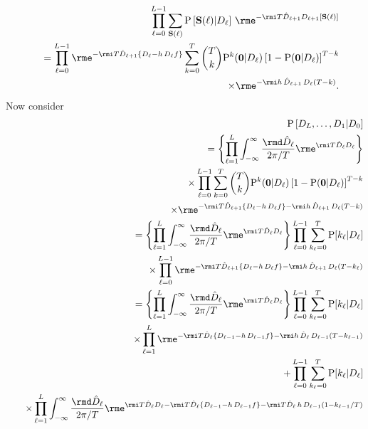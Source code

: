 \documentclass[10pt]{iopart}
\newcommand{\1}{\mathbf{1}}
\newcommand{\Prob}{\mathrm{P}}
\newcommand{\Sm}{\ensuremath{\mathbf{S}}}
\begin{document}
%
\begin{eqnarray}
&&\prod_{\ell=0}^{L-1}\sum_{\Sm(\ell)}\Prob\left[\Sm(\ell)\vert D_\ell\right]\,\rme^{-\rmi T\hat{D}_{\ell+1} D_{\ell+1}[\Sm(\ell)]}\nonumber\\
&&~=\prod_{\ell=0}^{L-1}\rme^{-\rmi T\hat{D}_{\ell+1} \left\{D_{\ell}-h\,D_{\ell}f \right\}}\sum_{k=0}^T{T\choose k}\Prob^k(\mathbf{0}\vert D_\ell)\left[1-\Prob(\mathbf{0}\vert D_\ell)\right]^{T-k}\nonumber\\
&&~~~~~~~~~~~~\times\rme^{-\rmi h\,\hat{D}_{\ell+1} \,D_{\ell} (T-k)}.
%
\end{eqnarray}
%
Now consider 
%
\begin{eqnarray}
&&\Prob\left[D_{L},\ldots,D_{1}\vert D_{0}\right]\nonumber\\
%
&&=\left\{\prod_{\ell=1}^L\int_{-\infty}^{\infty}\frac{\rmd\hat{D}_\ell}{2\pi/T}\rme^{\rmi T\hat{D}_\ell D_{\ell}}\right\}\nonumber\\
&&\times\prod_{\ell=0}^{L-1}\sum_{k=0}^T{T\choose k}\Prob^k(\mathbf{0}\vert D_\ell)\left[1-\Prob(\mathbf{0}\vert D_\ell)\right]^{T-k}\nonumber\\
&&~~~\times\rme^{-\rmi T\hat{D}_{\ell+1} \left\{D_{\ell}-h\,D_{\ell}f \right\}-\rmi h\,\hat{D}_{\ell+1} \,D_{\ell} (T-k)}\nonumber\\
%
&&=\left\{\prod_{\ell=1}^L\int_{-\infty}^{\infty}\frac{\rmd\hat{D}_\ell}{2\pi/T}\rme^{\rmi T\hat{D}_\ell D_{\ell}}\right\}\prod_{\ell=0}^{L-1}\sum_{k_\ell=0}^T\Prob[k_\ell\vert D_\ell]\nonumber\\
&&~~~\times\prod_{\ell=0}^{L-1}\rme^{-\rmi T\hat{D}_{\ell+1} \left\{D_{\ell}-h\,D_{\ell}f \right\}-\rmi h\,\hat{D}_{\ell+1} \,D_{\ell} (T-k_\ell)}\nonumber\\
%
&&=\left\{\prod_{\ell=1}^L\int_{-\infty}^{\infty}\frac{\rmd\hat{D}_\ell}{2\pi/T}\rme^{\rmi T\hat{D}_\ell D_{\ell}}\right\}\prod_{\ell=0}^{L-1}\sum_{k_\ell=0}^T\Prob[k_\ell\vert D_\ell]\nonumber\\
&&~~~\times\prod_{\ell=1}^{L}\rme^{-\rmi T\hat{D}_{\ell} \left\{D_{\ell-1}-h\,D_{\ell-1}f \right\}-\rmi h\,\hat{D}_{\ell} \,D_{\ell-1} (T-k_{\ell-1})}\nonumber\\
%
&&+\prod_{\ell=0}^{L-1}\sum_{k_\ell=0}^T\Prob[k_\ell\vert D_\ell]\nonumber\\
&&~~~\times\prod_{\ell=1}^{L}\int_{-\infty}^{\infty}\frac{\rmd\hat{D}_\ell}{2\pi/T}\rme^{\rmi T\hat{D}_\ell D_{\ell}-\rmi T\hat{D}_{\ell} \left\{D_{\ell-1}-h\,D_{\ell-1}f \right\}-\rmi T\hat{D}_{\ell} \,h\,D_{\ell-1} (1-k_{\ell-1}/T)}\nonumber\\

\end{eqnarray}
\end{document}
